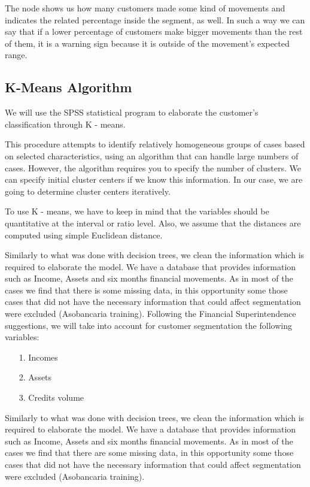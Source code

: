 The node shows us how many customers made some kind of movements and indicates the related percentage inside the segment, as well.
In such a way we can say that if a lower percentage of customers make bigger movements than the rest of them, it is a warning sign because it is outside of the movement’s expected range.

 \subsection{K-Means Algorithm}
We will use the SPSS statistical program to elaborate the customer’s classification through K - means.\par
This procedure attempts to identify relatively homogeneous groups of cases based on selected characteristics, using an algorithm that can handle large numbers of cases.  However, the algorithm requires you to specify the number of clusters.  We can specify initial cluster centers if we know this information. In our case, we are going to determine cluster centers iteratively.\par
To use K - means, we have to keep in mind that the variables should be quantitative at the interval or ratio level.  Also, we assume that the distances are computed using simple Euclidean distance.\par
Similarly to what was done with decision trees, we clean the information which is required to elaborate the model. We have a database that provides information such as Income, Assets and six months financial movements. As in most of the cases we find that there is some missing data, in this opportunity some those cases that did not have the necessary information that could affect segmentation were excluded (Asobancaria training).
Following the Financial Superintendence suggestions, we will take into account for customer segmentation the following variables:
\begin{itemize}
\item[1.] Incomes
\item[2.] Assets
\item[3.] Credits volume
\end{itemize}
Similarly to what was done with decision trees, we clean the information which is required to elaborate the model. We have a database that provides information such as Income, Assets and six months financial movements. As in most of the cases we find that there are some missing data, in this opportunity some those cases that did not have the necessary information that could affect segmentation were excluded (Asobancaria training).
